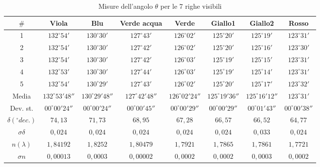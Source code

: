 \documentclass{article}
\begin{document}
\begin{table}[h!]
\centering
\begin{tabular}{ | c | c | c | c | c | c | c | c | }
  \hline
   $\#$ & Viola & Blu & Verde acqua & Verde & Giallo1 & Giallo2 & Rosso \\
  \hline
  1 & $132^{\circ} 54'$ & $130^{\circ} 30'$ & $127^{\circ} 43'$ & $126^{\circ} 02'$ & $125^{\circ} 20'$ &  $125^{\circ} 19'$ &  $123^{\circ} 31'$ \\
  2 & $132^{\circ} 54'$ & $130^{\circ} 30'$ & $127^{\circ} 42'$ & $126^{\circ} 02'$ & $125^{\circ} 20'$ &  $125^{\circ} 16'$ &  $123^{\circ} 30'$ \\
  3 & $132^{\circ} 54'$ & $130^{\circ} 30'$ & $127^{\circ} 42'$ & $126^{\circ} 03'$ & $125^{\circ} 19'$ &  $125^{\circ} 15'$ &  $123^{\circ} 31'$ \\
  4 & $132^{\circ} 53'$ & $130^{\circ} 30'$ & $127^{\circ} 44'$ & $126^{\circ} 03'$ & $125^{\circ} 19'$ &  $125^{\circ} 14'$ &  $123^{\circ} 31'$ \\
  5 & $132^{\circ} 54'$ & $130^{\circ} 29'$ & $127^{\circ} 43'$ & $126^{\circ} 02'$ & $125^{\circ} 20'$ &  $125^{\circ} 17'$ &  $123^{\circ} 32'$ \\
  \hline
  Media & $132^{\circ} 53' 48''$ & $130^{\circ} 29' 48''$ & $127^{\circ} 42' 48''$ & $126^{\circ} 02' 24''$ & $125^{\circ} 19' 36''$ &  $125^{\circ} 16' 12''$ &  $123^{\circ} 31'$ \\
  Dev. st. & $00^{\circ} 00' 24''$ & $00^{\circ} 00' 24''$ & $00^{\circ} 00' 45''$ & $00^{\circ} 00' 29''$ & $00^{\circ} 00' 29''$ & $00^{\circ} 01' 43''$ & $00^{\circ} 00' 38''$ \\
  \hline
  $\delta (^{\circ} dec.)$ & $74,13$ & $71,73$ & $68,95$ & $67,28$ & $66,57$ & $66,52$ & $64,77$ \\
  $\sigma \delta $ & $0,024$ & $0,024$ & $0,024$ & $0,024$ & $0,024$ & $0,033$ & $0,024$ \\
  \hline
  $n (\lambda)$ & $1,84192$ & $1,8252$ & $1,80479$ & $1,7921$ & $1,7865$ & $1,7861$ & $1,7721$ \\
  $\sigma n$ & $0,00013$ & $0,0003$ & $0,00002$ & $0,0002$ & $0,0002$ & $0,0003$ & $0,0002$ \\
  \hline
\end{tabular}
  \caption{Misure dell'angolo $\theta$ per le 7 righe visibili}
  \label{table:1}
\end{table}
\end{document}
